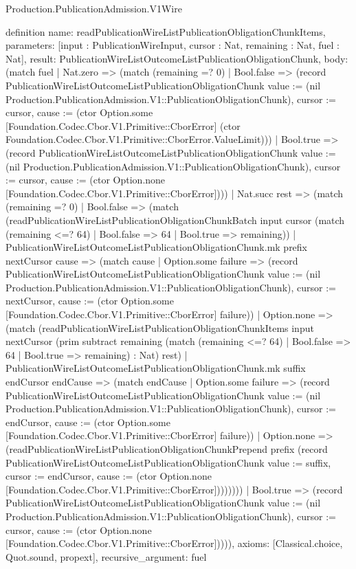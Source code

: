 \begin{lexlean}{Production.PublicationAdmission.V1Wire}
\begin{semanticmodule}
definition{
  name: readPublicationWireListPublicationObligationChunkItems,
  parameters: [input : PublicationWireInput, cursor : Nat, remaining : Nat, fuel : Nat],
  result: PublicationWireListOutcomeListPublicationObligationChunk,
  body: (match fuel
    | Nat.zero => (match (remaining =? 0)
      | Bool.false => (record PublicationWireListOutcomeListPublicationObligationChunk {value := (nil Production.PublicationAdmission.V1::PublicationObligationChunk), cursor := cursor, cause := (ctor Option.some [Foundation.Codec.Cbor.V1.Primitive::CborError] (ctor Foundation.Codec.Cbor.V1.Primitive::CborError.ValueLimit))})
      | Bool.true => (record PublicationWireListOutcomeListPublicationObligationChunk {value := (nil Production.PublicationAdmission.V1::PublicationObligationChunk), cursor := cursor, cause := (ctor Option.none [Foundation.Codec.Cbor.V1.Primitive::CborError])}))
    | Nat.succ rest => (match (remaining =? 0)
      | Bool.false => (match (readPublicationWireListPublicationObligationChunkBatch input cursor (match (remaining <=? 64)
          | Bool.false => 64
          | Bool.true => remaining))
        | PublicationWireListOutcomeListPublicationObligationChunk.mk prefix nextCursor cause => (match cause
          | Option.some failure => (record PublicationWireListOutcomeListPublicationObligationChunk {value := (nil Production.PublicationAdmission.V1::PublicationObligationChunk), cursor := nextCursor, cause := (ctor Option.some [Foundation.Codec.Cbor.V1.Primitive::CborError] failure)})
          | Option.none => (match (readPublicationWireListPublicationObligationChunkItems input nextCursor (prim subtract remaining (match (remaining <=? 64)
              | Bool.false => 64
              | Bool.true => remaining) : Nat) rest)
            | PublicationWireListOutcomeListPublicationObligationChunk.mk suffix endCursor endCause => (match endCause
              | Option.some failure => (record PublicationWireListOutcomeListPublicationObligationChunk {value := (nil Production.PublicationAdmission.V1::PublicationObligationChunk), cursor := endCursor, cause := (ctor Option.some [Foundation.Codec.Cbor.V1.Primitive::CborError] failure)})
              | Option.none => (readPublicationWireListPublicationObligationChunkPrepend prefix (record PublicationWireListOutcomeListPublicationObligationChunk {value := suffix, cursor := endCursor, cause := (ctor Option.none [Foundation.Codec.Cbor.V1.Primitive::CborError])}))))))
      | Bool.true => (record PublicationWireListOutcomeListPublicationObligationChunk {value := (nil Production.PublicationAdmission.V1::PublicationObligationChunk), cursor := cursor, cause := (ctor Option.none [Foundation.Codec.Cbor.V1.Primitive::CborError])}))),
  axioms: [Classical.choice, Quot.sound, propext],
  recursive_argument: fuel
}


\end{semanticmodule}
\end{lexlean}
